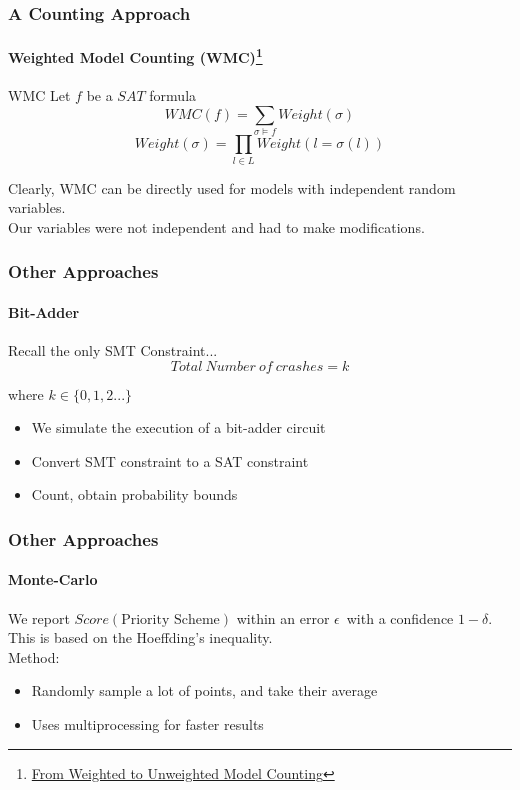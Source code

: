\documentclass{beamer}
\begin{document}
\begin{frame}
\frametitle{A Counting Approach}
\framesubtitle{Weighted Model Counting (WMC)\footnote{\href{http://ijcai.org/Proceedings/15/Papers/103.pdf}{From Weighted to Unweighted Model Counting}}}

	\begin{block}{WMC}
	Let $f$ be a $SAT$ formula
		$$WMC(f) = \sum_{\sigma \vDash f}Weight(\sigma)$$
		$$Weight(\sigma) = \prod_{l \in L}{Weight(l=\sigma(l))}$$
	\end{block}
	Clearly, WMC can be directly used for models with independent random variables.\\
	\pause
	\color{red}
	Our variables were not independent and had to make modifications.\\

\end{frame}


\begin{frame}
\frametitle{Other Approaches}
\framesubtitle{Bit-Adder}
	\begin{block}{Recall the only SMT Constraint...}
	$$Total\ Number\ of\ crashes = k$$
	\begin{flushright}
		where $k\in\{0,1,2...\}$
	\end{flushright}
	\end{block}

	\begin{itemize}
	\item We simulate the execution of a bit-adder circuit
	\item Convert SMT constraint to a SAT constraint
	\item Count, obtain probability bounds
	\end{itemize}
\end{frame}

\begin{frame}
\frametitle{Other Approaches}
\framesubtitle{Monte-Carlo}
	We report $Score(\text{Priority Scheme})$ within an error $\epsilon$\ with a confidence $1-\delta$.\\[2ex]
	This is based on the Hoeffding's inequality.\\[2ex]
	Method:
	\begin{itemize}
	\item Randomly sample a lot of points, and take their average
	\item Uses multiprocessing for faster results
	\end{itemize}
\end{frame}
\end{document}
